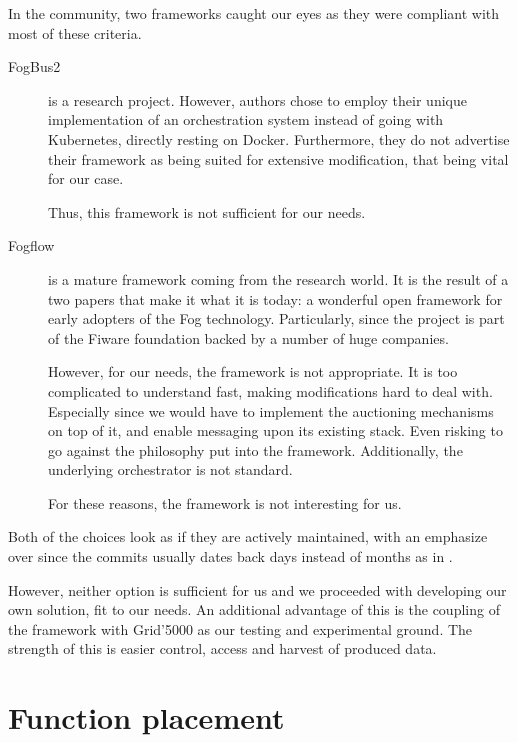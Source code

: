 In the community, two frameworks caught our eyes as they were compliant with most of these criteria.
\begin{description}
	\item[FogBus2 \cite{deng_fogbus2_2021}]{is a research project. However, authors chose to employ their unique implementation of an orchestration system instead of going with Kubernetes, directly resting on Docker. Furthermore, they do not advertise their framework as being suited for extensive modification, that being vital for our case.

	            Thus, this framework is not sufficient for our needs.
	      }
	\item[Fogflow \cite{smartfog_fogflow_2022}]{is a mature framework coming from the research world. It is the result of a two papers \cite{cheng_fogflow_2018, cheng_fog_2019} that make it what it is today: a wonderful open framework for early adopters of the Fog technology. Particularly, since the project is part of the Fiware foundation \cite{fiware_foundation_fiware_2021} backed by a number of huge companies.

	            However, for our needs, the framework is not appropriate. It is too complicated to understand fast, making modifications hard to deal with. Especially since we would have to implement the auctioning mechanisms on top of it, and enable messaging upon its existing stack. Even risking to go against the philosophy put into the framework. Additionally, the underlying orchestrator is not standard.

	            For these reasons, the framework is not interesting for us.}
\end{description}

Both of the choices look as if they are actively maintained, with an emphasize over \cite{smartfog_fogflow_2022} since the commits usually dates back days instead of months as in \cite{deng_fogbus2_2021}.

However, neither option is sufficient for us and we proceeded with developing our own solution, fit to our needs. An additional advantage of this is the coupling of the framework with Grid'5000 as our testing and experimental ground. The strength of this is easier control, access and harvest of produced data.


\section{Function placement}
\label{sec:placement}


